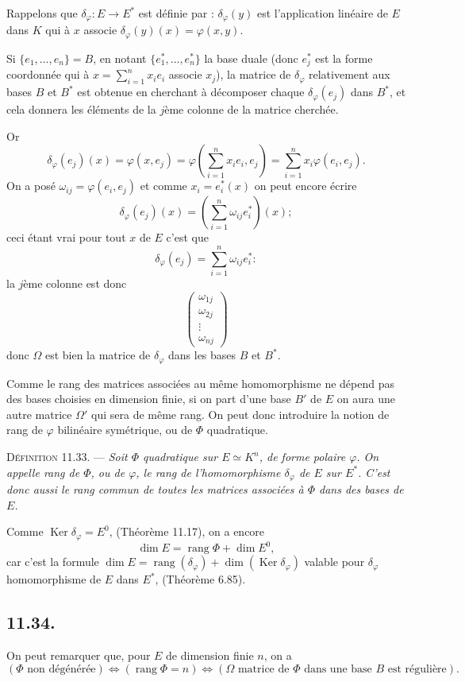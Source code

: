 Rappelons que $\delta_\varphi:E\longrightarrow E^*$ est définie par : $\delta_\varphi(y)$ est l'application linéaire de $E$ dans $K$ qui à $x$ associe $\delta_\varphi(y)(x)=\varphi(x,y)$.

Si $\{e_1,\ldots,e_n\}=B$, en notant $\{e_1^*,\ldots,e_n^*\}$ la base duale (donc $e_j^*$ est la forme coordonnée qui à $x=\sum_{i=1}^nx_ie_i$ associe $x_j$), la matrice de $\delta_\varphi$ relativement aux bases $B$ et $B^*$ est obtenue en cherchant à décomposer chaque $\delta_\varphi(e_j)$ dans $B^*$, et cela donnera les éléments de la $j$ème colonne de la matrice cherchée.

Or
\[
\delta_\varphi(e_j)(x)=\varphi(x,e_j)=\varphi\left(\sum_{i=1}^nx_ie_i,e_j\right)=\sum_{i=1}^nx_i\varphi(e_i,e_j).
\]
On a posé $\omega_{ij}=\varphi(e_i,e_j)$ et comme $x_i=e_i^*(x)$ on peut encore écrire
\[
\delta_\varphi(e_j)(x)=\left(\sum_{i=1}^n\omega_{ij}e_i^*\right)(x);
\]
ceci étant vrai pour tout $x$ de $E$ c'est que
\[
\delta_\varphi(e_j)=\sum_{i=1}^n\omega_{ij}e_i^*:
\]
la $j$ème colonne est donc
\[
\begin{pmatrix}\omega_{1j}\\\omega_{2j}\\\vdots\\\omega_{nj}\end{pmatrix}
\]
donc $\Omega$ est bien la matrice de $\delta_\varphi$ dans les bases $B$ et $B^*$. \bookend

Comme le rang des matrices associées au même homomorphisme ne dépend pas des bases choisies en dimension finie, si on part d'une base $B'$ de $E$ on aura une autre matrice $\Omega'$ qui sera de même rang. On peut donc introduire la notion de rang de $\varphi$ bilinéaire symétrique, ou de $\Phi$ quadratique.

\medskip\noindent\textsc{Définition 11.33.} --- \emph{Soit $\Phi$ quadratique sur $E\simeq K^n$, de forme polaire $\varphi$. On appelle rang de $\Phi$, ou de $\varphi$, le rang de l'homomorphisme $\delta_\varphi$ de $E$ sur $E^*$. C'est donc aussi le rang commun de toutes les matrices associées à $\Phi$ dans des bases de $E$.}

Comme $\operatorname{Ker}\delta_\varphi=E^0$, (Théorème 11.17), on a encore
\[
\dim E=\operatorname{rang}\Phi+\dim E^0,
\]
car c'est la formule $\dim E=\operatorname{rang}(\delta_\varphi)+\dim(\operatorname{Ker}\delta_\varphi)$ valable pour $\delta_\varphi$ homomorphisme de $E$ dans $E^*$, (Théorème 6.85).

\subsection*{11.34.}
On peut remarquer que, pour $E$ de dimension finie $n$, on a
\[
(\Phi\text{ non dégénérée})\Longleftrightarrow(\operatorname{rang}\Phi=n)
\Longleftrightarrow(\Omega\text{ matrice de }\Phi\text{ dans une base }B\text{ est régulière}).
\]

